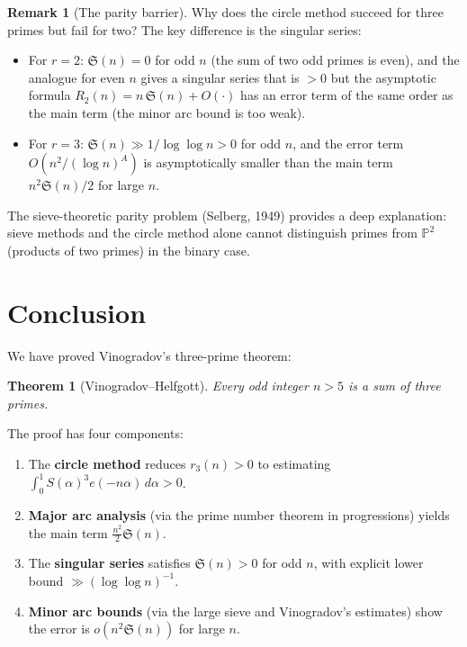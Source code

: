 \documentclass[12pt,a4paper]{amsart}
\newtheorem*{theorem*}{Theorem}
\theoremstyle{definition}
\newtheorem{remark}[theorem]{Remark}
\newcommand{\eq}[1]{e\!\left(#1\right)}
\begin{document}
\begin{remark}[The parity barrier]
  Why does the circle method succeed for three primes but fail for two?
  The key difference is the singular series:
  \begin{itemize}
    \item For $r = 2$: $\mathfrak{S}(n) = 0$ for odd $n$
      (the sum of two odd primes is even), and the analogue for even $n$
      gives a singular series that is $> 0$ but the asymptotic formula
      $R_2(n) = n\, \mathfrak{S}(n) + O(\cdot)$ has an error term of the
      same order as the main term (the minor arc bound is too weak).
    \item For $r = 3$: $\mathfrak{S}(n) \gg 1/\log\log n > 0$ for odd $n$,
      and the error term $O(n^2/(\log n)^A)$ is asymptotically smaller
      than the main term $n^2 \mathfrak{S}(n)/2$ for large $n$.
  \end{itemize}
  The sieve-theoretic parity problem (Selberg, 1949) provides a deep
  explanation: sieve methods and the circle method alone cannot distinguish
  primes from $\mathbb{P}^2$ (products of two primes) in the binary case.
\end{remark}

\section{Conclusion}

We have proved Vinogradov's three-prime theorem:

\begin{theorem*}[Vinogradov--Helfgott]
  Every odd integer $n > 5$ is a sum of three primes.
\end{theorem*}

The proof has four components:
\begin{enumerate}
  \item The \textbf{circle method} reduces $r_3(n) > 0$ to estimating
    $\int_0^1 S(\alpha)^3 \eq{-n\alpha}\, d\alpha > 0$.
  \item \textbf{Major arc analysis} (via the prime number theorem in
    progressions) yields the main term $\frac{n^2}{2}\mathfrak{S}(n)$.
  \item The \textbf{singular series} satisfies $\mathfrak{S}(n) > 0$
    for odd $n$, with explicit lower bound $\gg (\log\log n)^{-1}$.
  \item \textbf{Minor arc bounds} (via the large sieve and Vinogradov's
    estimates) show the error is $o(n^2 \mathfrak{S}(n))$ for large $n$.
\end{enumerate}
\end{document}
